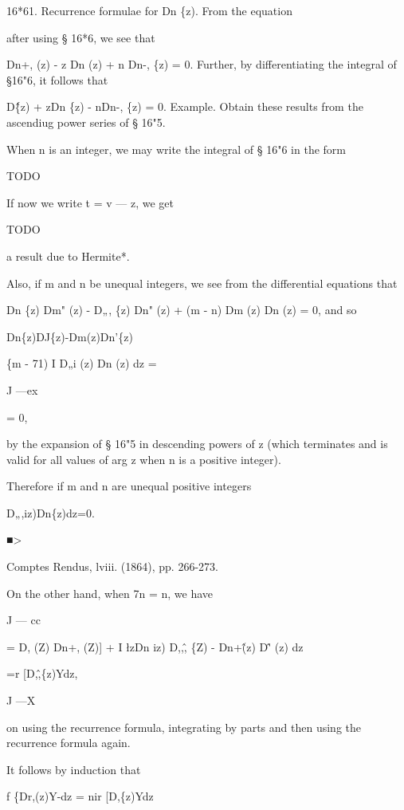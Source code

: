 16*61. Recurrence formulae for Dn \{z). From the equation

after using § 16*6, we see that

Dn+, (z) - z Dn (z) + n Dn-, \{z) = 0. Further, by differentiating the
integral of §16"6, it follows that

D\^ \{z) + zDn \{z) - nDn-, \{z) = 0. Example. Obtain these results
from the ascendiug power series of § 16"5.


When n is an integer, we may write the integral of § 16"6 in the form

TODO

If now we write t = v — z, we get

TODO

a result due to Hermite*.

Also, if m and n be unequal integers, we see from the differential
equations that

Dn \{z) Dm" (z) - D„, \{z) Dn" (z) + (m - n) Dm (z) Dn (z) = 0, and so



Dn\{z)DJ\{z)-Dm(z)Dn'\{z)



\{m - 71) I D„i (z) Dn (z) dz =

J —ex

= 0,

by the expansion of § 16"5 in descending powers of z (which terminates
and is valid for all values of arg z when n is a positive integer).

Therefore if m and n are unequal positive integers

D„,iz)Dn\{z)dz=0.

■>

Comptes Rendus, lviii. (1864), pp. 266-273.


%
%

On the other hand, when 7n = n, we have

J — cc

= D, (Z) Dn+, (Z)] + I \l zDn iz) D,,\^, \{Z) - Dn+\^ (z) D\^' (z) dz

=r [D,\^,\{z)Ydz,

J —X

on using the recurrence formula, integrating by parts and then using
the recurrence formula again.

It follows by induction that

f \{Dr,(z)Y-dz = nir [D,\{z)Ydz

